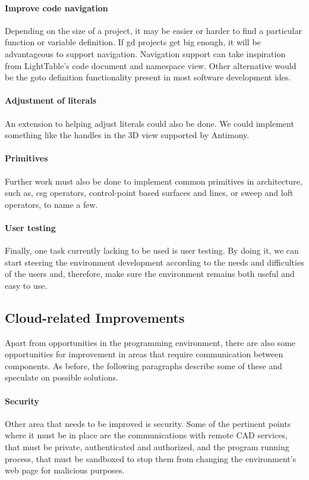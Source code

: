 \paragraph{Improve code navigation}
Depending on the size of a project, it may be easier or harder to find a particular function or variable definition.
If \gls{gd} projects get big enough, it will be advantageous to support navigation.
Navigation support can take inspiration from LightTable's code document and namespace view.
Other alternative would be the goto definition functionality present in most software development \glspl{ide}.

\paragraph{Adjustment of literals}
An extension to helping adjust literals could also be done.
We could implement something like the handles in the 3D view supported by Antimony.

\paragraph{Primitives}
Further work must also be done to implement common primitives in architecture, such as, \gls{csg} operators, control-point based surfaces and lines, or sweep and loft operators, to name a few.

\paragraph{User testing}
Finally, one task currently lacking to be used is user testing.
By doing it, we can start steering the environment development according to the needs and difficulties of the users and, therefore, make sure the environment remains both useful and easy to use.

\subsection{Cloud-related Improvements}
Apart from opportunities in the programming environment, there are also some opportunities for improvement in areas that require communication between components.
As before, the following paragraphs describe some of these and speculate on possible solutions.

\paragraph{Security}
Other area that needs to be improved is security.
Some of the pertinent points where it must be in place are the communications with remote CAD services, that must be private, authenticated and authorized, and the program running process, that must be sandboxed to stop them from changing the environment's web page for malicious purposes.

